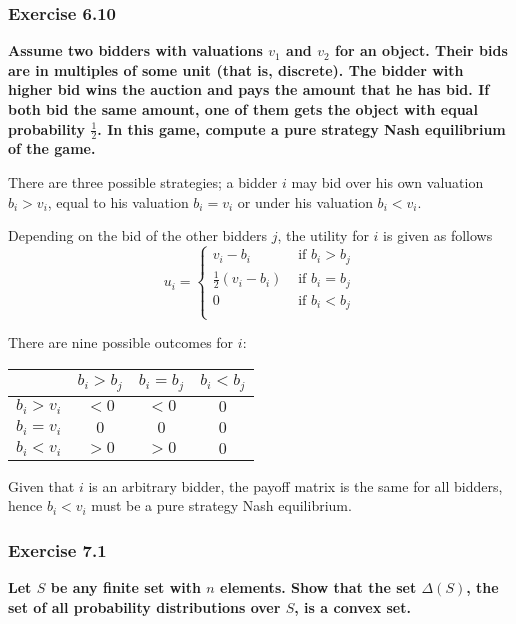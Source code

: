 \documentclass[12pt, a4paper]{article}
\begin{document}
\subsubsection*{Exercise 6.10}

\textbf{Assume two bidders with valuations $v_1$ and $v_2$ for an object. Their bids are in multiples of some unit (that is, discrete). The bidder with higher bid wins the auction and pays the amount that he has bid. If both bid the same amount, one of them gets the object with equal probability $\frac{1}{2}$. In this game, compute a pure strategy Nash equilibrium of the game.}

There are three possible strategies; a bidder $i$ may bid over his own valuation $b_i > v_i$, equal to his valuation $b_i = v_i$ or under his valuation $b_i < v_i$.

Depending on the bid of the other bidders $j$, the utility for $i$ is given as follows
\[
u_i =
\begin{cases}
v_i - b_i & \text{ if } b_i > b_j \\
\frac{1}{2}(v_i - b_i) & \text{ if } b_i = b_j \\
0 & \text{ if } b_i < b_j \\
\end{cases}
\]

There are nine possible outcomes for $i$:
\begin{table}[ht!]
	\centering
	\begin{tabular}{|c|c|c|c|} \hline
		& $b_i > b_j$ & $b_i = b_j$ & $b_i < b_j$ \\ \hline
		$b_i > v_i$ & $<0$ & $<0$ & $0$ \\ \hline
		$b_i = v_i$ & $0$ & $0$ & $0$ \\ \hline
		$b_i < v_i$ & $>0$ & $>0$ & $0$ \\ \hline
	\end{tabular}
\end{table}

Given that $i$ is an arbitrary bidder, the payoff matrix is the same for all bidders, hence $b_i < v_i$ must be a pure strategy Nash equilibrium.


\subsubsection*{Exercise 7.1}

\textbf{Let $S$ be any finite set with $n$ elements. Show that the set $\Delta(S)$, the set of all probability distributions over $S$, is a convex set.}
\end{document}
